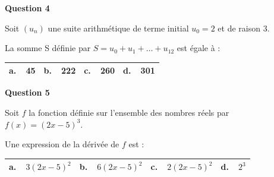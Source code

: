 \documentclass[10pt]{article}
\begin{document}
\textbf{Question 4}

\medskip

Soit $\left(u_n\right)$ une suite arithmétique de terme initial $u_0 = 2$ et de raison $3$.

La somme S définie par $S = u_0 + u_1 +\ldots + u_{12}$ est égale à :

\begin{center}
\begin{tabularx}{\linewidth}{|*{4}{X|}}\hline
\textbf{a.~~}45&\textbf{b.~~}222&\textbf{c.~~}260&\textbf{d.~~}301\\ \hline
\end{tabularx}
\end{center} 

\textbf{Question 5}

\medskip

Soit $f$ la fonction définie sur l'ensemble des nombres réels par $f(x) = (2x - 5)^3$.

Une expression de la dérivée de $f$ est :

\begin{center}
\begin{tabularx}{\linewidth}{|*{4}{X|}}\hline
\textbf{a.~~}$3(2x- 5)^2$&\textbf{b.~~}$6(2x- 5)^2$&\textbf{c.~~}$2(2x- 5)^2$&\textbf{d.~~}$2^3$\\ \hline
\end{tabularx}
\end{center} 

\medskip
\end{document}

